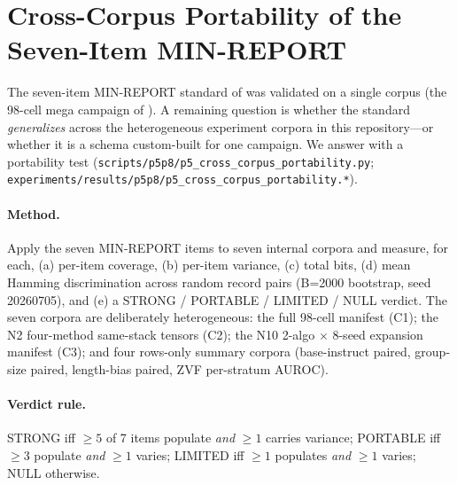 \section{Cross-Corpus Portability of the Seven-Item MIN-REPORT}
\label{sec:p5-cross-corpus}

The seven-item MIN-REPORT standard of  was
validated on a single corpus (the 98-cell mega campaign of
). A remaining question is whether
the standard \emph{generalizes} across the heterogeneous experiment
corpora in this repository---or whether it is a schema custom-built
for one campaign. We answer with a portability test
(\texttt{scripts/p5p8/p5\_cross\_corpus\_portability.py};
\texttt{experiments/results/p5p8/p5\_cross\_corpus\_portability.*}).

\paragraph{Method.}
Apply the seven MIN-REPORT items to seven internal corpora and
measure, for each, (a) per-item coverage, (b) per-item variance,
(c) total bits, (d) mean Hamming discrimination across random record
pairs (B=2000 bootstrap, seed 20260705), and (e) a STRONG /
PORTABLE / LIMITED / NULL verdict. The seven corpora are
deliberately heterogeneous: the full 98-cell manifest (C1); the
N2 four-method same-stack tensors (C2); the N10 2-algo $\times$
8-seed expansion manifest (C3); and four rows-only summary corpora
(base-instruct paired, group-size paired, length-bias paired, ZVF
per-stratum AUROC).

\paragraph{Verdict rule.}
STRONG iff $\geq 5$ of 7 items populate \emph{and} $\geq 1$ carries
variance; PORTABLE iff $\geq 3$ populate \emph{and} $\geq 1$
varies; LIMITED iff $\geq 1$ populates \emph{and} $\geq 1$ varies;
NULL otherwise.

